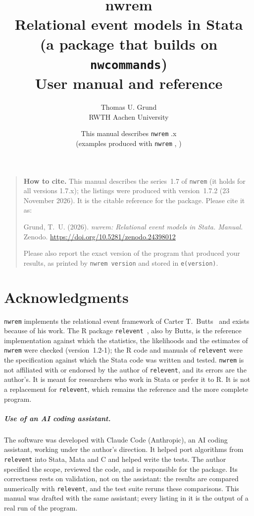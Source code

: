 \documentclass[11pt,a4paper]{report}
\title{\textbf{nwrem}\\[4pt]\large Relational event models in Stata\\ (a package that builds on \texttt{nwcommands})\\[6pt]\normalsize User manual and reference}
\author{Thomas U. Grund\\ RWTH Aachen University}
\date{This manual describes \texttt{nwrem} \manualseries.x\\ (examples produced with \texttt{nwrem} \pkgversion, \pkgdate)}
\newcommand{\nwrem}{\texttt{nwrem}}
\newcommand{\relevent}{\texttt{relevent}}
\newcommand{\releventver}{1.2-1}
\newcommand{\manualseries}{1.7}
\newcommand{\pkgversion}{1.7.2}
\newcommand{\pkgdate}{23 November 2026}
\newcommand{\manualdoi}{10.5281/zenodo.24398012}
\newcommand{\citedoi}{ Zenodo. \url{https://doi.org/\manualdoi}}
\begin{document}
\maketitle
\begin{quote}\noindent\textbf{How to cite.} This manual describes the series~\manualseries{} of \nwrem{} (it holds for all versions \manualseries.x); the listings were produced with version~\pkgversion{} (\pkgdate). It is the citable reference for the package. Please cite it as:\par\smallskip
\noindent Grund, T.~U. (2026). \emph{nwrem: Relational event models in Stata. Manual.}\citedoi\par\smallskip
\noindent Please also report the exact version of the program that produced your results, as printed by \texttt{nwrem version} and stored in \texttt{e(version)}.
\end{quote}
\chapter*{Acknowledgments}
\nwrem{} implements the relational event framework of Carter T.\ Butts~\cite{butts2008} and exists because of his work. The R package \relevent{}~\cite{relevent}, also by Butts, is the reference implementation against which the statistics, the likelihoods and the estimates of \nwrem{} were checked (version~\releventver{}); the R code and manuals of \relevent{} were the specification against which the Stata code was written and tested. \nwrem{} is not affiliated with or endorsed by the author of \relevent{}, and its errors are the author's. It is meant for researchers who work in Stata or prefer it to R. It is not a replacement for \relevent{}, which remains the reference and the more complete program.

\paragraph{Use of an AI coding assistant.} The software was developed with Claude Code (Anthropic), an AI coding assistant, working under the author's direction. It helped port algorithms from \relevent{} into Stata, Mata and C and helped write the tests. The author specified the scope, reviewed the code, and is responsible for the package. Its correctness rests on validation, not on the assistant: the results are compared numerically with \relevent{}, and the test suite reruns these comparisons. This manual was drafted with the same assistant; every listing in it is the output of a real run of the program.
\end{document}
